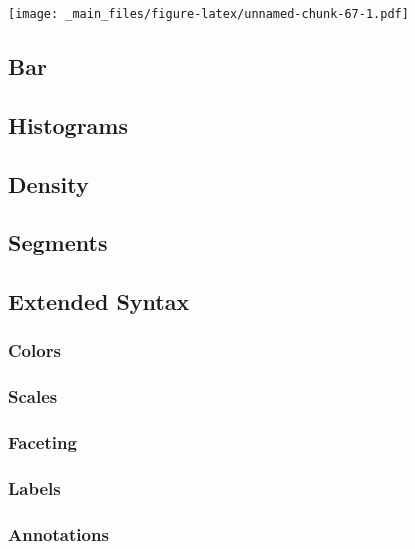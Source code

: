 \documentclass[
]{book}
\begin{document}
\texttt{[image: \_main\_files/figure-latex/unnamed-chunk-67-1.pdf]}

\hypertarget{bar}{%
\subsection{Bar}\label{bar}}

\hypertarget{histograms}{%
\subsection{Histograms}\label{histograms}}

\hypertarget{density}{%
\subsection{Density}\label{density}}

\hypertarget{segments}{%
\subsection{Segments}\label{segments}}

\hypertarget{extended-syntax}{%
\subsection{Extended Syntax}\label{extended-syntax}}

\hypertarget{colors}{%
\subsubsection{Colors}\label{colors}}

\hypertarget{scales}{%
\subsubsection{Scales}\label{scales}}

\hypertarget{faceting}{%
\subsubsection{Faceting}\label{faceting}}

\hypertarget{labels}{%
\subsubsection{Labels}\label{labels}}

\hypertarget{annotations}{%
\subsubsection{Annotations}\label{annotations}}
\end{document}
